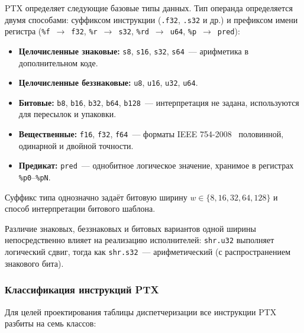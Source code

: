 PTX определяет следующие базовые типы данных. Тип операнда определяется
двумя способами: суффиксом инструкции (\texttt{.f32}, \texttt{.s32} и др.)
и префиксом имени регистра (\texttt{\%f}~$\to$~\texttt{f32},
\texttt{\%r}~$\to$~\texttt{s32}, \texttt{\%rd}~$\to$~\texttt{u64},
\texttt{\%p}~$\to$~\texttt{pred}):

\begin{itemize}
  \item \textbf{Целочисленные знаковые:} \texttt{s8}, \texttt{s16},
        \texttt{s32}, \texttt{s64}~--- арифметика в дополнительном коде.
  \item \textbf{Целочисленные беззнаковые:} \texttt{u8}, \texttt{u16},
        \texttt{u32}, \texttt{u64}.
  \item \textbf{Битовые:} \texttt{b8}, \texttt{b16}, \texttt{b32},
        \texttt{b64}, \texttt{b128}~--- интерпретация не задана,
        используются для пересылок и упаковки.
  \item \textbf{Вещественные:} \texttt{f16}, \texttt{f32}, \texttt{f64}~---
        форматы IEEE 754-2008~\cite{IEEE754-2008} половинной, одинарной и двойной точности.
  \item \textbf{Предикат:} \texttt{pred}~--- однобитное логическое значение,
        хранимое в регистрах \texttt{\%p0}--\texttt{\%pN}.
\end{itemize}

Суффикс типа однозначно задаёт битовую ширину $w \in \{8, 16, 32, 64, 128\}$
и способ интерпретации битового шаблона.

Различие знаковых, беззнаковых и битовых вариантов одной ширины
непосредственно влияет на реализацию исполнителей: \texttt{shr.u32}
выполняет логический сдвиг, тогда как \texttt{shr.s32}~---
арифметический (с распространением знакового бита).

\subsubsection{Классификация инструкций PTX}

Для целей проектирования таблицы диспетчеризации все инструкции PTX
разбиты на семь классов:

